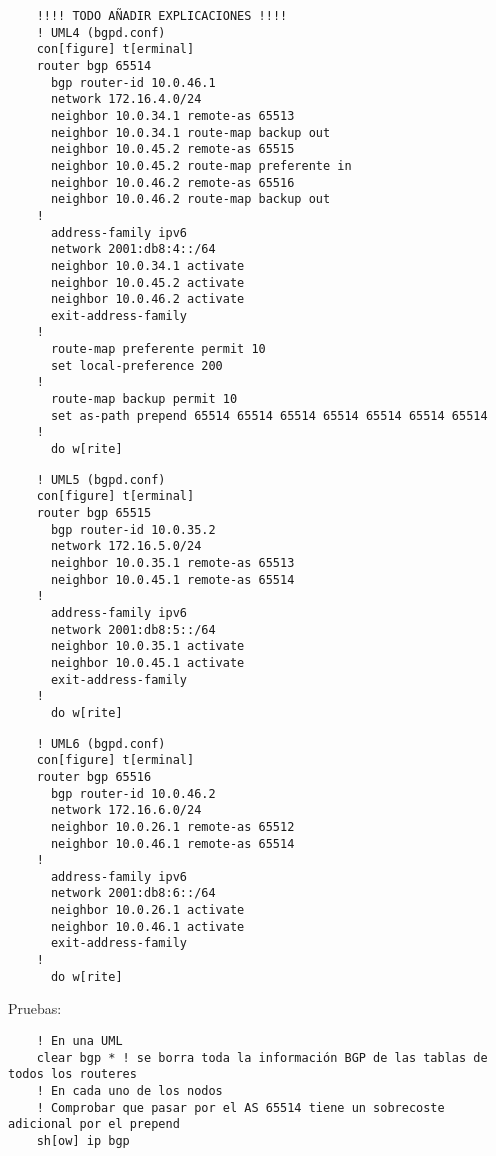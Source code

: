   \begin{verbatim}
    !!!! TODO AÑADIR EXPLICACIONES !!!!
    ! UML4 (bgpd.conf)
    con[figure] t[erminal]
    router bgp 65514
      bgp router-id 10.0.46.1
      network 172.16.4.0/24
      neighbor 10.0.34.1 remote-as 65513
      neighbor 10.0.34.1 route-map backup out
      neighbor 10.0.45.2 remote-as 65515
      neighbor 10.0.45.2 route-map preferente in
      neighbor 10.0.46.2 remote-as 65516
      neighbor 10.0.46.2 route-map backup out
    !
      address-family ipv6
      network 2001:db8:4::/64
      neighbor 10.0.34.1 activate
      neighbor 10.0.45.2 activate
      neighbor 10.0.46.2 activate
      exit-address-family
    !
      route-map preferente permit 10
      set local-preference 200
    !
      route-map backup permit 10
      set as-path prepend 65514 65514 65514 65514 65514 65514 65514
    !
      do w[rite]
  \end{verbatim}

  \begin{verbatim}
    ! UML5 (bgpd.conf)
    con[figure] t[erminal]
    router bgp 65515
      bgp router-id 10.0.35.2
      network 172.16.5.0/24
      neighbor 10.0.35.1 remote-as 65513
      neighbor 10.0.45.1 remote-as 65514
    !
      address-family ipv6
      network 2001:db8:5::/64
      neighbor 10.0.35.1 activate
      neighbor 10.0.45.1 activate
      exit-address-family
    !
      do w[rite]
  \end{verbatim}

  \begin{verbatim}
    ! UML6 (bgpd.conf)
    con[figure] t[erminal]
    router bgp 65516
      bgp router-id 10.0.46.2
      network 172.16.6.0/24
      neighbor 10.0.26.1 remote-as 65512
      neighbor 10.0.46.1 remote-as 65514
    !
      address-family ipv6
      network 2001:db8:6::/64
      neighbor 10.0.26.1 activate
      neighbor 10.0.46.1 activate
      exit-address-family
    !
      do w[rite]
  \end{verbatim}

  Pruebas:
  \begin{verbatim}
    ! En una UML
    clear bgp * ! se borra toda la información BGP de las tablas de todos los routeres
    ! En cada uno de los nodos
    ! Comprobar que pasar por el AS 65514 tiene un sobrecoste adicional por el prepend
    sh[ow] ip bgp
  \end{verbatim}
